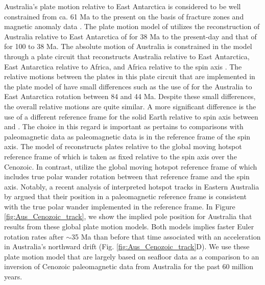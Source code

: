 \documentclass[11pt,letterpaper]{article}
\begin{document}
Australia's plate motion relative to East Antarctica is considered to be well constrained from ca. 61 Ma to the present on the basis of fracture zones and magnetic anomaly data \citep{Cande2004a}. The plate motion model of \cite{Muller2016a} utilizes the reconstruction of Australia relative to East Antarctica of \cite{Cande2004a} for 38 Ma to the present-day and that of \cite{Whittaker2007a} for 100 to 38 Ma. The absolute motion of Australia is constrained in the model through a plate circuit that reconstructs Australia relative to East Antarctica, East Antarctica relative to Africa, and Africa relative to the spin axis \citep{Muller2016a}. The relative motions between the plates in this plate circuit that are implemented in the plate model of \cite{Torsvik2017a} have small differences such as the use of \cite{Tikku2000a} for the Australia to East Antarctica rotation between 84 and 44 Ma. Despite these small differences, the overall relative motions are quite similar. A more significant difference is the use of a different reference frame for the solid Earth relative to spin axis between \cite{Muller2016a} and \cite{Torsvik2017a}. The choice in this regard is important as pertains to comparisons with paleomagnetic data as paleomagnetic data is in the reference frame of the spin axis. The model of \cite{Muller2016a} reconstructs plates relative to the global moving hotspot reference frame of \cite{Torsvik2008a} which is taken as fixed relative to the spin axis over the Cenozoic. In contrast, \cite{Torsvik2017a} utilize the global moving hotspot reference frame of \cite{Doubrovine2012a} which includes true polar wander rotation between that reference frame and the spin axis. Notably, a recent analysis of interpreted hotspot tracks in Eastern Australia by \cite{Hansma2020a} argued that their position in a paleomagnetic reference frame is consistent with the true polar wander implemented in the \cite{Doubrovine2012a} reference frame. In Figure \ref{fig:Aus_Cenozoic_track}, we show the implied pole position for Australia that results from these global plate motion models. Both models implies faster Euler rotation rates after $\sim$35 Ma than before that time associated with an acceleration in Australia's northward drift (Fig. \ref{fig:Aus_Cenozoic_track}D). We use these plate motion model that are largely based on seafloor data as a comparison to an inversion of Cenozoic paleomagnetic data from Australia for the past 60 million years.
\end{document}

